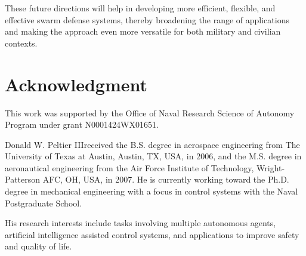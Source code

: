\documentclass[journal]{IEEEtran} %
\begin{document}
These future directions will help in developing more efficient, flexible, and effective swarm defense systems, thereby broadening the range of applications and making the approach even more versatile for both military and civilian contexts.



\section*{Acknowledgment}
This work was supported by the Office of Naval Research Science of Autonomy Program under grant N0001424WX01651.








\begin{IEEEbiography}
{Donald W. Peltier III}received the B.S. degree in aerospace engineering from The University of Texas at Austin, Austin, TX, USA, in 2006, and the M.S. degree in aeronautical engineering from the Air Force Institute of Technology, Wright-Patterson AFC, OH, USA, in 2007. He is currently working toward the Ph.D. degree in mechanical engineering with a focus in control systems with the Naval Postgraduate School.

His research interests include tasks involving multiple autonomous agents, artificial intelligence assisted control systems, and applications to improve safety and quality of life.
\end{IEEEbiography}
\end{document}
